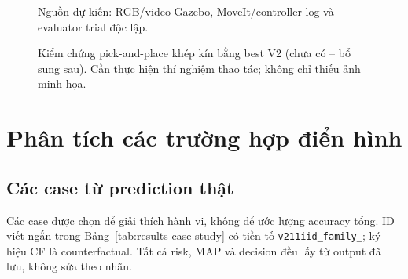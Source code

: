 \begin{figure}[htbp]
    \centering
    \caption{Kiểm chứng pick-and-place khép kín bằng
    best V2 (chưa có -- bổ sung sau).
    Cần thực hiện thí nghiệm thao tác; không chỉ
    thiếu ảnh minh họa.}
    \label{fig:results-robot-trial-pending}
    {\footnotesize Nguồn dự kiến: RGB/video Gazebo,
    MoveIt/controller log và evaluator trial độc lập.\par}
\end{figure}

\section{Phân tích các trường hợp điển hình}
\label{sec:results-case-study}

\subsection{Các case từ prediction thật}

Các case được chọn để giải thích hành vi, không
để ước lượng accuracy tổng. ID viết ngắn trong
Bảng~\ref{tab:results-case-study} có tiền tố
\texttt{v211iid\_\allowbreak family\_\allowbreak }; ký hiệu CF là
counterfactual. Tất cả risk, MAP và decision
đều lấy từ output đã lưu, không sửa theo nhãn.

